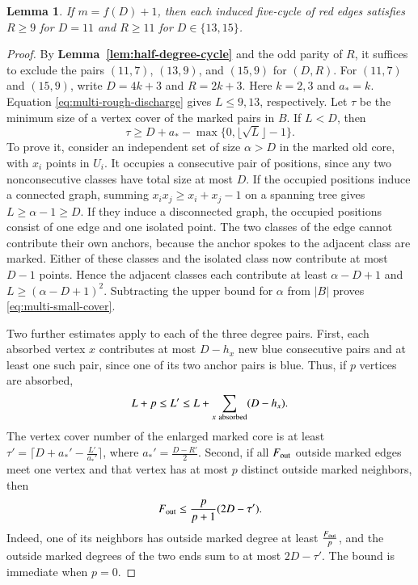 \documentclass[preprint,11pt,numbers]{elsarticle-arxiv}
\numberwithin{equation}{section}
\newtheorem{lemma}[theorem]{Lemma}
\theoremstyle{definition}
\begin{document}
\begin{lemma}\label{lem:odd-slack-refinements}
If $m=f(D)+1$, then each induced five-cycle of red edges satisfies
$R\ge9$ for $D=11$ and $R\ge11$ for $D\in\{13,15\}$.
\end{lemma}

\begin{proof}
By \textbf{Lemma~\ref{lem:half-degree-cycle}} and the odd parity of $R$,
it suffices to exclude the pairs $(11,7)$, $(13,9)$, and $(15,9)$ for $(D,R)$.
For $(11,7)$ and $(15,9)$, write $D=4k+3$ and $R=2k+3$.
Here $k=2,3$ and $a_*=k$. Equation \eqref{eq:multi-rough-discharge}
gives $L\le9,13$, respectively. Let $\tau$ be the minimum size
of a vertex cover of the marked pairs in $B$. If $L<D$, then
\begin{equation}\label{eq:multi-small-cover}
 \tau\ge D+a_*-\max\{0,\lfloor\sqrt L\rfloor-1\}.
\end{equation}
To prove it, consider an independent set of size $\alpha>D$ in
the marked old core, with $x_i$ points in $U_i$. It occupies a
consecutive pair of positions, since any two nonconsecutive classes
have total size at most $D$. If the occupied positions induce a
connected graph, summing $x_i x_j\ge x_i+x_j-1$ on a spanning tree
gives $L\ge\alpha-1\ge D$. If they induce a disconnected graph,
the occupied positions consist of one edge and one isolated point.
The two classes of the edge cannot contribute their own anchors,
because the anchor spokes to the adjacent class are marked. Either
of these classes and the isolated class now contribute at most
$D-1$ points. Hence the adjacent classes
each contribute at least $\alpha-D+1$ and $L\ge(\alpha-D+1)^2$.
Subtracting the upper bound for $\alpha$ from $|B|$ proves
\eqref{eq:multi-small-cover}.

Two further estimates apply to each of the three degree pairs. First, each absorbed vertex
$x$ contributes at most $D-h_x$ new blue consecutive pairs and at
least one such pair, since one of its two anchor pairs is blue.
Thus, if $p$ vertices are absorbed,
\begin{equation}\label{eq:multi-new-blue}
 L+p\le L'\le L+\sum_{x\ {\rm absorbed}}(D-h_x).
\end{equation}
The vertex cover number of the enlarged marked core is at least
$\tau'=\lceil D+a_*'-\frac{L'}{a_*'}\rceil$,
where $a_*'=\frac{D-R'}{2}$. Second, if all $F_{\rm out}$ outside marked
edges meet one vertex and that vertex has at most $p$
distinct outside marked neighbors, then
\begin{equation}\label{eq:multi-center-cut}
 F_{\rm out}\le\frac{p}{p+1}(2D-\tau').
\end{equation}
Indeed, one of its neighbors has outside marked degree at least
$\frac{F_{\rm out}}{p}$, and the outside marked degrees of the two ends sum to
at most $2D-\tau'$. The bound is immediate when $p=0$.


\end{proof}
\end{document}
